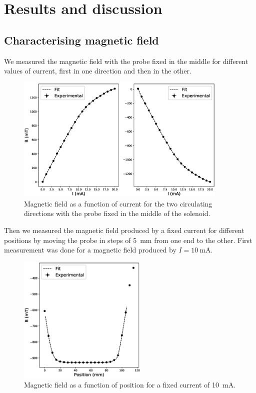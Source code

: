 \documentclass[11pt,a4paper]{article}
\begin{document}
\newpage

\section{Results and discussion}

\subsection{Characterising magnetic field}

We measured the magnetic field with the probe fixed in the middle for different values of current, first in one direction and then in the other.

\begin{figure}[H]
\centering
\includegraphics[width=0.9\textwidth]{B_diff_current.eps}
\caption{Magnetic field as a function of current for the two circulating directions with the probe fixed in the middle of the solenoid.}
\label{fig:BvsI}
\end{figure}

Then we measured the magnetic field produced by a fixed current for different positions by moving the probe in steps of \SI{5}{\mm} from one end to the other. First measurement was done for a magnetic field produced by $I=\SI{10}{\mA}$.

\begin{figure}[H]
\centering
\includegraphics[width=0.55\textwidth]{B_diff_position1.eps}
\caption{Magnetic field as a function of position for a fixed current of \SI{10}{\mA}.}
\label{fig:BvsPos1}
\end{figure}
\end{document}

